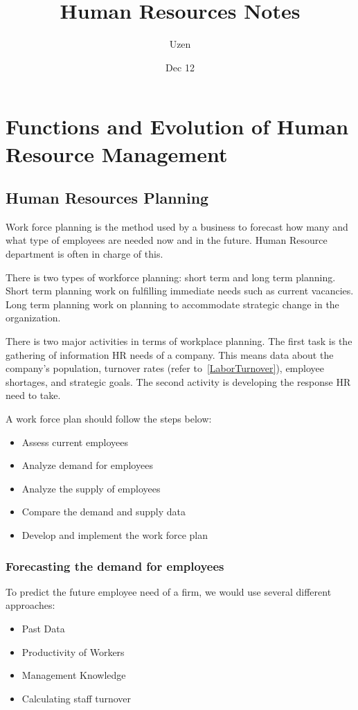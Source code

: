 \documentclass{report}
\title{Human Resources Notes}
\author{Uzen}
\date{Dec 12}
\begin{document}
\maketitle
\newpage
\tableofcontents
\newpage

\chapter{Functions and Evolution of Human Resource Management}

\section{Human Resources Planning}
Work force planning is the method used by a business to forecast how many and what type of employees are needed now and in the future.
Human Resource department is often in charge of this. 

There is two types of workforce planning: short term and long term planning.
Short term planning work on fulfilling immediate needs such as current vacancies.
Long term planning work on planning to accommodate strategic change in the organization.

There is two major activities in terms of workplace planning.
The first task is the gathering of information HR needs of a company. 
This means data about the company's population, turnover rates (refer to~\ref{LaborTurnover}), employee shortages, and strategic goals.  The second activity is developing the response HR need to take.

A work force plan should follow the steps below:
\begin{itemize}
	\item Assess current employees
	\item Analyze demand for employees
	\item Analyze the supply of employees
	\item Compare the demand and supply data
	\item Develop and implement the work force plan
\end{itemize}

\subsection{Forecasting the demand for employees}
To predict the future employee need of a firm, we would use several different approaches:
\begin{itemize}
	\item Past Data
	\item Productivity of Workers
	\item Management Knowledge
	\item Calculating staff turnover
\end{itemize}
\end{document}

